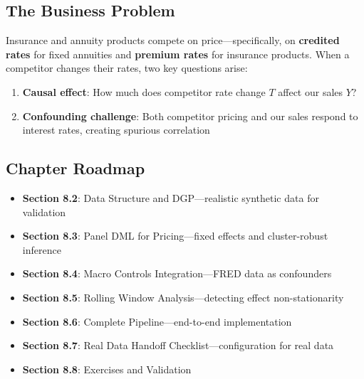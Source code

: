 \subsection{The Business Problem}

Insurance and annuity products compete on price---specifically, on \textbf{credited rates} for fixed annuities and \textbf{premium rates} for insurance products. When a competitor changes their rates, two key questions arise:

\begin{enumerate}
    \item \textbf{Causal effect}: How much does competitor rate change $T$ affect our sales $Y$?
    \item \textbf{Confounding challenge}: Both competitor pricing and our sales respond to interest rates, creating spurious correlation
\end{enumerate}


\subsection{Chapter Roadmap}

\begin{itemize}
    \item \textbf{Section 8.2}: Data Structure and DGP---realistic synthetic data for validation
    \item \textbf{Section 8.3}: Panel DML for Pricing---fixed effects and cluster-robust inference
    \item \textbf{Section 8.4}: Macro Controls Integration---FRED data as confounders
    \item \textbf{Section 8.5}: Rolling Window Analysis---detecting effect non-stationarity
    \item \textbf{Section 8.6}: Complete Pipeline---end-to-end implementation
    \item \textbf{Section 8.7}: Real Data Handoff Checklist---configuration for real data
    \item \textbf{Section 8.8}: Exercises and Validation
\end{itemize}

